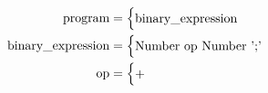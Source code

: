 \documentclass[12pt, a4paper]{article}
\newcommand{\ebnfnode}[2]{%
\text{#1} &=
\begin{cases}
    #2
\end{cases}\\
}
\begin{document}
    \begin{align}
        \ebnfnode{program}{\text{binary\textunderscore expression}}
        \ebnfnode{binary\textunderscore expression}{\text{Number op Number ';'}}
        \ebnfnode{op}{\text{+}}
    \end{align}
\end{document}
